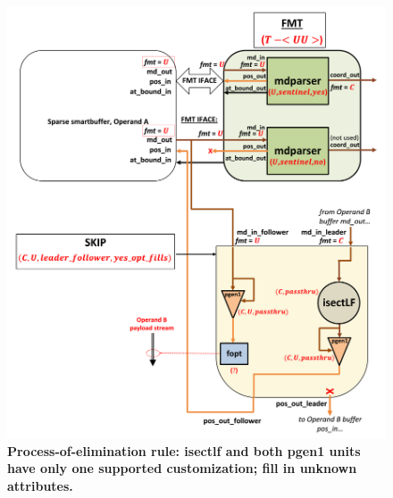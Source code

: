 \begin{figure}[ht]
\includegraphics[width=\textwidth]{figures/safinference_build_12isectlfpgenoneopt.png}
\caption{\textbf{Process-of-elimination rule: isectlf and both pgen1 units have only one supported customization; fill in unknown attributes. }}
\label{fig:safinference_build_12isectlfpgenoneopt}
\centering
\end{figure}

